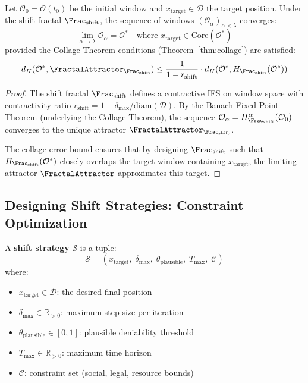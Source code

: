 \begin{theorem}
\label{thm:shift-convergence}
Let $\mathcal{O}_0 = \mathcal{O}(t_0)$ be the initial window and
$x_{\mathrm{target}} \in \mathcal{D}$ the target position. Under the shift fractal
$\Frac_{\mathrm{shift}}$, the sequence of windows $(\mathcal{O}_\alpha)_{\alpha < \lambda}$
converges:
\[
    \lim_{\alpha \to \lambda} \mathcal{O}_\alpha = \mathcal{O}^*
    \quad \text{where } x_{\mathrm{target}} \in \mathrm{Core}(\mathcal{O}^*)
\]
provided the Collage Theorem conditions (Theorem~\ref{thm:collage}) are satisfied:
\[
    d_H(\mathcal{O}^*, \FractalAttractor_{\Frac_{\mathrm{shift}}}) \leq
    \frac{1}{1 - r_{\mathrm{shift}}} \cdot d_H(\mathcal{O}^*,
    H_{\Frac_{\mathrm{shift}}}(\mathcal{O}^*))
\]
\end{theorem}

\begin{proof}
The shift fractal $\Frac_{\mathrm{shift}}$ defines a contractive IFS on window space
with contractivity ratio $r_{\mathrm{shift}} = 1 - \delta_{\max} / \mathrm{diam}(\mathcal{D})$.
By the Banach Fixed Point Theorem (underlying the Collage Theorem), the sequence
$\mathcal{O}_\alpha = H_{\Frac_{\mathrm{shift}}}^\alpha(\mathcal{O}_0)$ converges to
the unique attractor $\FractalAttractor_{\Frac_{\mathrm{shift}}}$.

The collage error bound ensures that by designing $\Frac_{\mathrm{shift}}$ such that
$H_{\Frac_{\mathrm{shift}}}(\mathcal{O}^*)$ closely overlaps the target window
containing $x_{\mathrm{target}}$, the limiting attractor $\FractalAttractor$
approximates this target.
\end{proof}

\subsection{Designing Shift Strategies: Constraint Optimization}

\begin{definition}
\label{def:shift-strategy}
A \textbf{shift strategy} $\mathcal{S}$ is a tuple:
\[
    \mathcal{S} = \left( x_{\mathrm{target}}, \; \delta_{\max}, \;
    \theta_{\mathrm{plausible}}, \; T_{\mathrm{max}}, \; \mathcal{C} \right)
\]
where:
\begin{itemize}
    \item $x_{\mathrm{target}} \in \mathcal{D}$: the desired final position
    \item $\delta_{\max} \in \mathbb{R}_{>0}$: maximum step size per iteration
    \item $\theta_{\mathrm{plausible}} \in [0,1]$: plausible deniability threshold
    \item $T_{\mathrm{max}} \in \mathbb{R}_{>0}$: maximum time horizon
    \item $\mathcal{C}$: constraint set (social, legal, resource bounds)
\end{itemize}
\end{definition}

